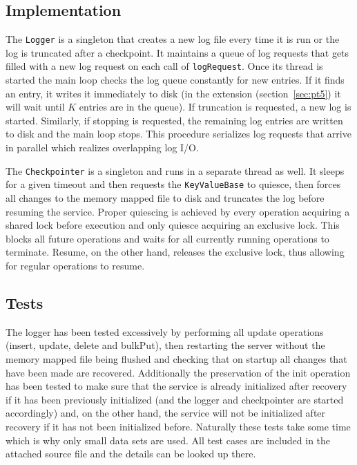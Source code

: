 \documentclass[a4paper,11pt]{article}
\begin{document}
\subsection{Implementation}
\label{sec:pt1}
The \texttt{Logger} is a singleton that creates a new log file every time it is run or the log is truncated after a checkpoint. It maintains a queue of log requests that gets filled with a new log request on each call of \texttt{logRequest}. Once its thread is started the main loop checks the log queue constantly for new entries. If it finds an entry, it writes it immediately to disk (in the extension (section~\ref{sec:pt5}) it will wait until \(K\) entries are in the queue). If truncation is requested, a new log is started. Similarly, if stopping is requested, the remaining log entries are written to disk and the main loop stops. This procedure serializes log requests that arrive in parallel which realizes overlapping log I/O.

The \texttt{Checkpointer} is a singleton and runs in a separate thread as well. It sleeps for a given timeout and then requests the \texttt{KeyValueBase} to quiesce, then forces all changes to the memory mapped file to disk and truncates the log before resuming the service. Proper quiescing is achieved by every operation acquiring a shared lock before execution and only quiesce acquiring an exclusive lock. This blocks all future operations and waits for all currently running operations to terminate. Resume, on the other hand, releases the exclusive lock, thus allowing for regular operations to resume.

\subsection{Tests}
\label{sec:pt2}
The logger has been tested excessively by performing all update operations (insert, update, delete and bulkPut), then restarting the server without the memory mapped file being flushed and checking that on startup all changes that have been made are recovered. Additionally the preservation of the init operation has been tested to make sure that the service is already initialized after recovery if it has been previously initialized (and the logger and checkpointer are started accordingly) and, on the other hand, the service will not be initialized after recovery if it has not been initialized before. Naturally these tests take some time which is why only small data sets are used. All test cases are included in the attached source file and the details can be looked up there.
\end{document}
